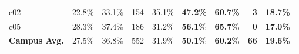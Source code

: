 \documentclass[conference]{IEEEtran}
\begin{document}
\begin{table}[t]
{\begin{tabular}{|l|r|r|r|r|r|r|r|r|}
c02 & 22.8\% & 33.1\% & 154 & 35.1\% & \textbf{47.2\%} & \textbf{60.7\%} & \textbf{3} & \textbf{18.7\%} \\ %
c05 & 28.3\% & 37.4\% & 186 & 31.2\% & \textbf{56.1\%} & \textbf{65.7\%} & \textbf{0} & \textbf{17.0\%} \\ %
\hline
\textbf{Campus Avg.} & 27.5\% & 36.8\% & 552 & 31.9\% & \textbf{50.1\%} & \textbf{60.2\%} & \textbf{66} & \textbf{19.6\%} \\ %
\hline
\end{tabular}%
}
\end{table}
\end{document}
